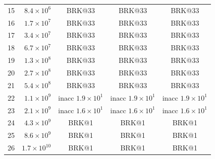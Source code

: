 \begin{tabular}{rr|ccc}
15 & $8.4\!\times\!10^{6}$ & \cellcolor{red!25}BRK@33 & \cellcolor{red!25}BRK@33 & \cellcolor{red!25}BRK@33\\
16 & $1.7\!\times\!10^{7}$ & \cellcolor{red!25}BRK@33 & \cellcolor{red!25}BRK@33 & \cellcolor{red!25}BRK@33\\
17 & $3.4\!\times\!10^{7}$ & \cellcolor{red!25}BRK@33 & \cellcolor{red!25}BRK@33 & \cellcolor{red!25}BRK@33\\
18 & $6.7\!\times\!10^{7}$ & \cellcolor{red!25}BRK@33 & \cellcolor{red!25}BRK@33 & \cellcolor{red!25}BRK@33\\
19 & $1.3\!\times\!10^{8}$ & \cellcolor{red!25}BRK@33 & \cellcolor{red!25}BRK@33 & \cellcolor{red!25}BRK@33\\
20 & $2.7\!\times\!10^{8}$ & \cellcolor{red!25}BRK@33 & \cellcolor{red!25}BRK@33 & \cellcolor{red!25}BRK@33\\
21 & $5.4\!\times\!10^{8}$ & \cellcolor{red!25}BRK@33 & \cellcolor{red!25}BRK@33 & \cellcolor{red!25}BRK@33\\
22 & $1.1\!\times\!10^{9}$ & \cellcolor{orange!30}inacc $1.9\!\times\!10^{1}$ & \cellcolor{orange!30}inacc $1.9\!\times\!10^{1}$ & \cellcolor{orange!30}inacc $1.9\!\times\!10^{1}$\\
23 & $2.1\!\times\!10^{9}$ & \cellcolor{orange!30}inacc $1.6\!\times\!10^{1}$ & \cellcolor{orange!30}inacc $1.6\!\times\!10^{1}$ & \cellcolor{orange!30}inacc $1.6\!\times\!10^{1}$\\
24 & $4.3\!\times\!10^{9}$ & \cellcolor{red!25}BRK@1 & \cellcolor{red!25}BRK@1 & \cellcolor{red!25}BRK@1\\
25 & $8.6\!\times\!10^{9}$ & \cellcolor{red!25}BRK@1 & \cellcolor{red!25}BRK@1 & \cellcolor{red!25}BRK@1\\
26 & $1.7\!\times\!10^{10}$ & \cellcolor{red!25}BRK@1 & \cellcolor{red!25}BRK@1 & \cellcolor{red!25}BRK@1\\
\bottomrule
\end{tabular}
